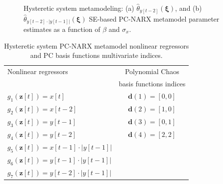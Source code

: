 \documentclass[preprint,3p,review,times,11pt]{elsarticle}
\newcommand{\bld}[1]{\boldsymbol{#1}}
\newcommand{\bxi}{\bld{\xi}}
\begin{document}
\begin{figure}[t!]
\caption{Hysteretic system metamodeling: (a) $\hat{\theta}_{y[t-2]}(\bxi)$, and (b) $\hat{\theta}_{y[t-2]\cdot |y[t-1]|}(\bxi)$ SE-based PC-NARX metamodel parameter estimates as a function of $\beta$ and $\sigma_x$.}
\label{fig:boucwen_surfs}
\end{figure}


\begin{table} 
\centering
\caption{Hysteretic system PC-NARX metamodel nonlinear regressors and PC basis functions multivariate indices.}\label{tab:PCNARXboucwen}
\small \begin{tabular}{lc}\hline 
Nonlinear regressors & Polynomial Chaos \\
 & basis functions indices \\\hline
$g_1({\bld z}[t]) = x[t]$ & ${\bld d}{(1)} = [0, 0]$ \\
$g_2({\bld z}[t]) = x[t-2]$ & ${\bld d}{(2)} = [1, 0]$ \\
$g_3({\bld z}[t]) = y[t-1]$ & ${\bld d}{(3)} = [0, 1]$ \\
$g_4({\bld z}[t]) = y[t-2]$ & ${\bld d}{(4)} = [2, 2]$ \\
$g_5({\bld z}[t]) = x[t-1] \cdot |y[t-1]|$ & \\
$g_6({\bld z}[t]) = y[t-1] \cdot |y[t-1]|$ & \\
$g_7({\bld z}[t]) = y[t-2] \cdot |y[t-1]|$ & \\ \hline
\end{tabular}
\end{table}
\end{document}
